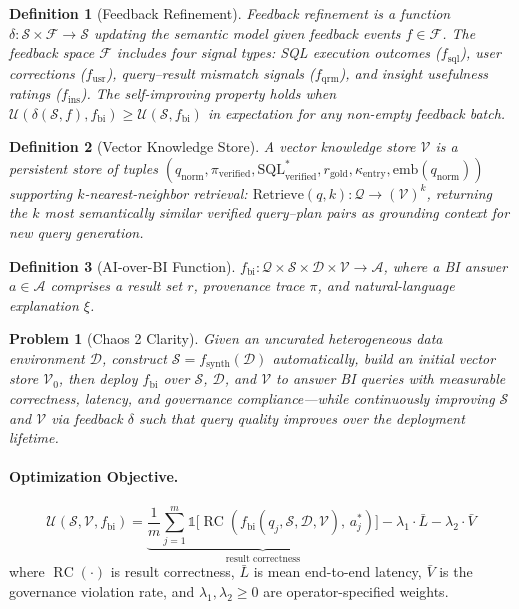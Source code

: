 \documentclass[11pt,a4paper]{article}
\newtheorem{definition}{Definition}
\newtheorem{problem}{Problem}
\DeclareMathOperator{\RC}{RC}
\newcommand{\C}[1]{\mathcal{#1}}
\begin{document}
\begin{definition}[Feedback Refinement]
\emph{Feedback refinement} is a function $\delta : \C{S} \times \C{F} \to \C{S}$
updating the semantic model given feedback events $f \in \C{F}$.  The feedback
space $\C{F}$ includes four signal types: SQL execution outcomes ($f_\mathrm{sql}$),
user corrections ($f_\mathrm{usr}$), query--result mismatch signals
($f_\mathrm{qrm}$), and insight usefulness ratings ($f_\mathrm{ins}$).  The
\emph{self-improving} property holds when $\C{U}(\delta(\C{S}, f), f_\mathrm{bi})
\geq \C{U}(\C{S}, f_\mathrm{bi})$ in expectation for any non-empty feedback batch.
\end{definition}

\begin{definition}[Vector Knowledge Store]
A \emph{vector knowledge store} $\C{V}$ is a persistent store of tuples
$(q_\mathrm{norm}, \pi_\mathrm{verified}, \mathrm{SQL}^*_\mathrm{verified},
r_\mathrm{gold}, \kappa_\mathrm{entry}, \mathrm{emb}(q_\mathrm{norm}))$
supporting $k$-nearest-neighbor retrieval: $\mathrm{Retrieve}(q, k) : \C{Q} \to
(\C{V})^k$, returning the $k$ most semantically similar verified query--plan pairs
as grounding context for new query generation.
\end{definition}

\begin{definition}[AI-over-BI Function]
$f_\mathrm{bi} : \C{Q} \times \C{S} \times \C{D} \times \C{V} \to \C{A}$, where
a \emph{BI answer} $a \in \C{A}$ comprises a result set $r$, provenance trace
$\pi$, and natural-language explanation $\xi$.
\end{definition}

\begin{problem}[Chaos 2 Clarity]
Given an uncurated heterogeneous data environment $\C{D}$, construct $\C{S} =
f_\mathrm{synth}(\C{D})$ automatically, build an initial vector store $\C{V}_0$,
then deploy $f_\mathrm{bi}$ over $\C{S}$, $\C{D}$, and $\C{V}$ to answer BI
queries with measurable correctness, latency, and governance compliance---while
continuously improving $\C{S}$ and $\C{V}$ via feedback $\delta$ such that query
quality improves over the deployment lifetime.
\end{problem}

\paragraph{Optimization Objective.}
\begin{equation}\label{eq:obj}
\C{U}(\C{S}, \C{V}, f_\mathrm{bi})
= \underbrace{\frac{1}{m}\sum_{j=1}^{m}
  \mathbb{1}\bigl[\RC(f_\mathrm{bi}(q_j,\C{S},\C{D},\C{V}),\, a^*_j)\bigr]
  }_{\text{result correctness}}
  - \lambda_1 \cdot \bar{L} - \lambda_2 \cdot \bar{V}
\end{equation}
where $\RC(\cdot)$ is result correctness, $\bar{L}$ is mean end-to-end latency,
$\bar{V}$ is the governance violation rate, and $\lambda_1, \lambda_2 \geq 0$ are
operator-specified weights.
\end{document}
